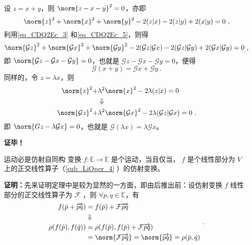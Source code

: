 设 $z=x+y$，则 $\norm{z-x-y}^2=0$，亦即
\begin{equation}
\norm{z}^2+\norm{x}^2+\norm{y}^2-2(z|x)-2(z|y)+2(x|y)=0~,
\end{equation}
利用\autoref{eq_CDQ2Ec_3} 和\autoref{eq_CDQ2Ec_5}，则得
\begin{equation}
\norm{\mathcal G z}^2+\norm{\mathcal G x}^2+\norm{\mathcal G y}^2-2(\mathcal G z|\mathcal G x)-2(\mathcal G z|\mathcal G y)+2(\mathcal G x|\mathcal G y)=0~,
\end{equation}
即 $\norm{\mathcal G z-\mathcal G x-\mathcal G y}=0$，也就是 $\mathcal G z-\mathcal Gx-\mathcal G y=0$，便得
\begin{equation}
\mathcal G(x+y)=\mathcal G x+\mathcal G y~.
\end{equation}
同样的，令 $z=\lambda x$，则
\begin{equation}
\begin{aligned}
\norm{z}^2+&\lambda^2\norm{x}^2-2\lambda(z|x)=0\\
&\Downarrow\\
\norm{\mathcal G z}^2+&\lambda^2\norm{\mathcal G x}^2-2\lambda(\mathcal G z|\mathcal G x)=0~.
\end{aligned}
\end{equation}
即 $\norm{G z-\lambda\mathcal G x}=0$，也就是 $\mathcal G (\lambda x)=\lambda\mathcal G x$。

\textbf{证毕！}



\begin{theorem}{运动必是仿射自同构}\label{the_CDQ2Ec_1}
变换 $f:\mathbb E\rightarrow\mathbb E$ 是个运动，当且仅当， $f$ 是个线性部分为 $V$ 上的正交线性算子（\autoref{sub_LiOper_4}  ）的仿射变换。
\end{theorem}
\textbf{证明：}先来证明定理中是较为显然的一方面，即由后推出前：设仿射变换 $f$ 线性部分的正交线性算子为 $\mathcal F$ ，则 $\forall \dot p,\dot q\in\mathbb E$，有
\begin{equation}
\begin{aligned}
f(\dot p+\overrightarrow{pq})&=f(\dot p)+\mathcal F\overrightarrow{pq}\\
&\Downarrow\\
\rho(f(\dot p),f(\dot q))&=\rho(f(\dot p),f(\dot p)+\mathcal F\overrightarrow{pq})\\
&=\norm{\mathcal F\overrightarrow{pq}}=\norm{\overrightarrow{pq}}=\rho(\dot p,\dot q)
\end{aligned}~.
\end{equation}

